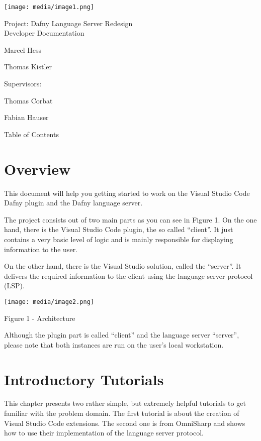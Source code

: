 \documentclass[]{book}
\date{}
\begin{document}
\texttt{[image: media/image1.png]}

Project: Dafny Language Server Redesign\\[2\baselineskip]Developer Documentation

Marcel Hess

Thomas Kistler

Supervisors:

Thomas Corbat

Fabian Hauser

\protect\hypertarget{_Toc19878868}{}{}Table of Contents

\chapter{Overview}\label{overview}

This document will help you getting started to work on the Visual Studio Code Dafny plugin and the Dafny language server.

The project consists out of two main parts as you can see in Figure 1. On the one hand, there is the Visual Studio Code plugin, the so called ``client''. It just contains a very basic level of logic and is mainly responsible for displaying information to the user.

On the other hand, there is the Visual Studio solution, called the ``server''. It delivers the required information to the client using the language server protocol (LSP).

\texttt{[image: media/image2.png]}

\protect\hypertarget{_Ref26821956}{}{}Figure 1 - Architecture

Although the plugin part is called ``client'' and the language server ``server'', please note that both instances are run on the user's local workstation.

\protect\hypertarget{_Toc19878871}{}{}

\chapter{Introductory Tutorials}\label{introductory-tutorials}

This chapter presents two rather simple, but extremely helpful tutorials to get familiar with the problem domain. The first tutorial is about the creation of Visual Studio Code extensions. The second one is from OmniSharp and shows how to use their implementation of the language server protocol.
\end{document}
